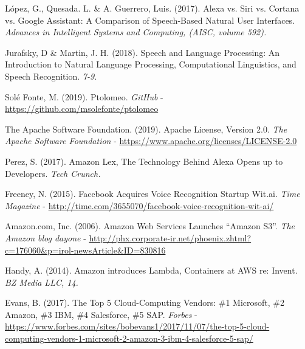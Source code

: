 \documentclass[11pt,spanish,listoffigures]{tfgetsinf}
\begin{document}
\begin{thebibliography}{10}
   López, G., Quesada. L. \& A. Guerrero, Luis. (2017).
   \newblock Alexa vs. Siri vs. Cortana vs. Google Assistant: A Comparison of Speech-Based Natural User Interfaces.
   \newblock \textit{Advances in Intelligent Systems and Computing, (AISC, volume 592).}
   
  	Jurafsky, D \& Martin, J. H. (2018).
	\newblock Speech and Language Processing: An Introduction to Natural Language Processing, Computational Linguistics, and Speech Recognition.
	\newblock \textit{7-9.}

  	Solé Fonte, M. (2019).
	\newblock Ptolomeo.
	\newblock \textit{GitHub}
	\newblock - \url{https://github.com/msolefonte/ptolomeo}
	
  	The Apache Software Foundation. (2019).
	\newblock Apache License, Version 2.0.
	\newblock \textit{The Apache Software Foundation}
	\newblock - \url{https://www.apache.org/licenses/LICENSE-2.0}

  	Perez, S. (2017).
	\newblock Amazon Lex, The Technology Behind Alexa Opens up to Developers. 
	\newblock \textit{Tech Crunch.}

  	Freeney, N. (2015).
	\newblock Facebook Acquires Voice Recognition Startup Wit.ai.
	\newblock \textit{Time Magazine}
	\newblock - \url{http://time.com/3655070/facebook-voice-recognition-wit-ai/}

  	Amazon.com, Inc. (2006).
	\newblock Amazon Web Services Launches “Amazon S3”.
	\newblock \textit{The Amazon blog dayone}
	\newblock - \url{http://phx.corporate-ir.net/phoenix.zhtml?c=176060&p=irol-newsArticle&ID=830816}

  	Handy, A. (2014).
	\newblock Amazon introduces Lambda, Containers at AWS re: Invent.
	\newblock \textit{BZ Media LLC, 14.}

  	Evans, B. (2017).
	\newblock The Top 5 Cloud-Computing Vendors: \#1 Microsoft, \#2 Amazon, \#3 IBM, \#4 Salesforce, \#5 SAP.
	\newblock \textit{Forbes}
	\newblock - \url{https://www.forbes.com/sites/bobevans1/2017/11/07/the-top-5-cloud-computing-vendors-1-microsoft-2-amazon-3-ibm-4-salesforce-5-sap/}


\end{thebibliography}
\end{document}
